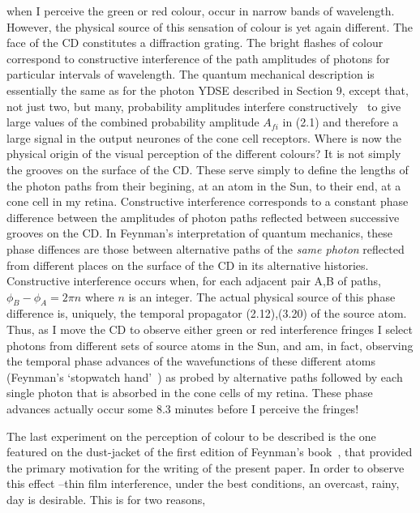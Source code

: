 {    when I perceive the green or red colour, occur in narrow bands of wavelength. However, the physical
    source of this sensation of colour is yet again different. The face of the CD constitutes a diffraction
    grating. The bright flashes of colour correspond to constructive interference of the path amplitudes
    of photons for particular intervals of wavelength. The quantum mechanical description is essentially
    the same as for the photon YDSE described in Section 9, except that, not just two, but many, probability
    amplitudes interfere constructively~\cite{JWDG} to give large values of the combined
    probability amplitude $A_{fi}$ in (2.1) and therefore a large signal in the output
    neurones of the cone cell receptors. Where is now the physical origin of the visual perception
   of the different colours? It is not simply the grooves on the surface of the CD. These serve simply to
    define the lengths of the photon paths from their begining, at an atom in the Sun, to
    their end, at a cone cell in my retina. Constructive interference corresponds to a constant
    phase difference between the amplitudes of photon paths reflected between successive grooves on
    the CD. In Feynman's interpretation of quantum mechanics, these phase diffences are those between
    alternative paths of the {\it same photon} reflected from different places on the surface of the 
     CD in its alternative histories. Constructive interference occurs when, for each adjacent pair 
     A,B of paths, $\phi_B-\phi_A = 2 \pi n$ where $n$ is an integer. The actual physical source
    of this phase difference is, uniquely, the temporal propagator (2.12),(3.20) of the source atom.
    Thus, as I move the CD to observe either green or red interference fringes I select photons
    from different sets of source atoms in the Sun, and am, in fact, observing the temporal phase
    advances of the wavefunctions of these different atoms (Feynman's `stopwatch hand'~\cite{Feyn1}) as probed
     by alternative paths followed by each single photon that is absorbed in the cone cells
     of my retina. These phase advances actually occur some 8.3 minutes before
    I perceive the fringes!
     \par The last experiment on the perception of colour to be described is the one featured on the
     dust-jacket of the first edition of Feynman's book~\cite{Feyn1}, that provided the primary motivation
     for the writing of the present paper. In order to observe this effect --thin film interference,
     under the best conditions, an overcast, rainy, day is desirable. This is for two reasons,
}
